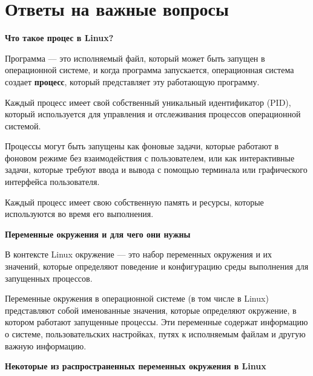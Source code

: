 \documentclass[oneside, final, 14pt]{extreport} %
\begin{document}
\section{Ответы на важные вопросы}

\textbf{Что такое процес в Linux?}

Программа --- это исполняемый файл, который может быть запущен в операционной системе, и когда программа запускается, операционная система создает \textbf{процесс}, который представляет эту работающую программу.

Каждый процесс имеет свой собственный уникальный идентификатор (PID), который используется для управления и отслеживания процессов операционной системой.

Процессы могут быть запущены как фоновые задачи, которые работают в фоновом режиме без взаимодействия с пользователем, или как интерактивные задачи, которые требуют ввода и вывода с помощью терминала или графического интерфейса пользователя.

Каждый процесс имеет свою собственную память и ресурсы, которые используются во время его выполнения.

\vspace*{\baselineskip}

\textbf{Переменные окружения и для чего они нужны}


В контексте Linux окружение --- это набор переменных окружения и их значений, которые определяют поведение и конфигурацию среды выполнения для запущенных процессов. 

Переменные окружения в операционной системе (в том числе в Linux) представляют собой именованные значения, которые определяют окружение, в котором работают запущенные процессы. Эти переменные содержат информацию о системе, пользовательских настройках, путях к исполняемым файлам и другую важную информацию.

\vspace{\baselineskip}

\textbf{Некоторые из распространенных переменных окружения в Linux }
\end{document}
